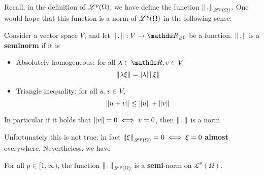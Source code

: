 Recall, in the definition of $\mathcal{L}^p(\Omega)$, we have define the function $\left\| \,.\, \right\|_{\mathcal{L}^p(\Omega)}$. One would hope that this function is a norm of $\mathcal{L}^p(\Omega)$ in the following sense:

\begin{definition} Consider a vector space $V$, and let $\norm{\,.\,}:V \to \R_{\geq 0}$ be a function. $\left\| \,.\, \right\|$ is a \textbf{seminorm} if it is
\begin{itemize}
    \item Absolutely homogeneous: for all $\lambda \in \R, v \in V$
    \begin{equation}
        \left\| \lambda \xi \right\| = |\lambda| \left\| \xi \right\|
    \end{equation}
    \item Triangle inequality: for all $u,v \in V$,
    \begin{equation}
        \left\| u + v \right\| \leq \left\| u \right\| + \left\| v \right\|
    \end{equation}
\end{itemize}
In particular if it holds that $\left\| v \right\| = 0 \iff v = 0$, then $\left\| \,.\, \right\|$ is a norm.
\end{definition}

Unfortunately this is not true: in fact $\left\| \xi \right\|_{\mathcal{L}^p(\Omega)} = 0 \iff \xi = 0$ \textbf{almost} everywhere. Nevertheless, we have
\begin{theorem}
For all $p \in [1,\infty)$, the function $\left\| \,.\, \right\|_{\mathcal{L}^p(\Omega)}$ is a \textbf{semi}-norm on $\mathcal{L}^p(\Omega)$.
\end{theorem}

